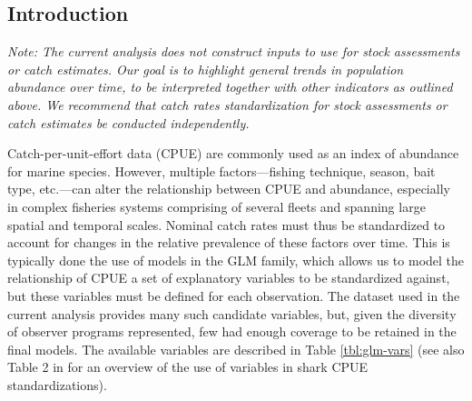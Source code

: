 
%

\subsection{Introduction}

\emph{Note: The current analysis does not construct inputs to use for stock assessments or catch estimates. Our goal is to highlight general trends in population abundance over time, to be interpreted together with other indicators as outlined above. We recommend that catch rates standardization for stock assessments or catch estimates be conducted independently.}


Catch-per-unit-effort data (CPUE) are commonly used as an index of abundance for marine species. However, multiple factors---fishing technique, season, bait type, etc.---can alter the relationship between CPUE and abundance, especially in complex fisheries systems comprising of several fleets and spanning large spatial and temporal scales. Nominal catch rates must thus be standardized to account for changes in the relative prevalence of these factors over time. This is typically done \via the use of models in the GLM family, which allows us to model the relationship of CPUE \vs a set of explanatory variables to be standardized against, but these variables must be defined for each observation. The dataset used in the current analysis provides many such candidate variables, but, given the diversity of observer programs represented, few had enough coverage to be retained in the final models. The available variables are described in Table \ref{tbl:glm-vars} (see also Table 2 in \citealt{Francis2014_a} for an overview of the use of variables in shark CPUE standardizations).

